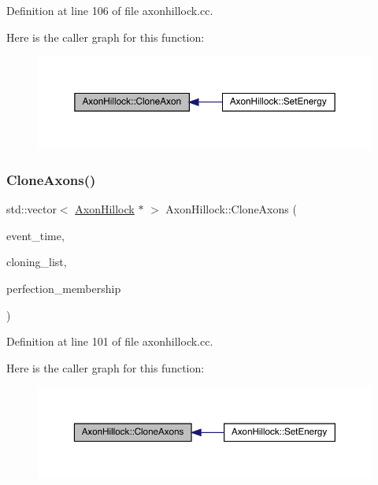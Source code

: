 Definition at line 106 of file axonhillock.\+cc.

Here is the caller graph for this function\+:\nopagebreak
\begin{figure}[H]
\begin{center}
\leavevmode
\includegraphics[width=350pt]{class_axon_hillock_ad54833cee03cfcacb5e88d174048aaa4_icgraph}
\end{center}
\end{figure}
\mbox{\label{class_axon_hillock_aa65cead56b10bda66dc256c68764a553}} 
\subsubsection{\texorpdfstring{Clone\+Axons()}{CloneAxons()}}
{\footnotesize\ttfamily std\+::vector$<$ \hyperlink{class_axon_hillock}{Axon\+Hillock} $\ast$ $>$ Axon\+Hillock\+::\+Clone\+Axons (\begin{DoxyParamCaption}\item[{std\+::chrono\+::time\+\_\+point$<$ \hyperlink{universe_8h_a0ef8d951d1ca5ab3cfaf7ab4c7a6fd80}{Clock} $>$}]{event\+\_\+time,  }\item[{std\+::vector$<$ \hyperlink{class_axon_hillock}{Axon\+Hillock} $\ast$$>$}]{cloning\+\_\+list,  }\item[{double}]{perfection\+\_\+membership }\end{DoxyParamCaption})}



Definition at line 101 of file axonhillock.\+cc.

Here is the caller graph for this function\+:\nopagebreak
\begin{figure}[H]
\begin{center}
\leavevmode
\includegraphics[width=350pt]{class_axon_hillock_aa65cead56b10bda66dc256c68764a553_icgraph}
\end{center}
\end{figure}
\mbox{\label{class_axon_hillock_ae6b18ec6f2921b9d4461b89a9d72ab25}} 
